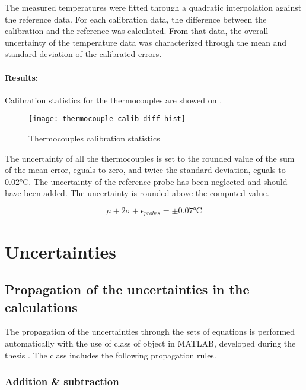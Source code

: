 The measured temperatures were fitted through a quadratic
interpolation against the reference data. For each calibration data,
the difference between the calibration and the reference was
calculated. From that data, the overall uncertainty of the temperature
data was characterized through the mean and standard deviation of the
calibrated errors.

\paragraph{Results:}

Calibration statistics for the thermocouples are showed on
.

\begin{figure}[h!htbp]
  \centering
  \texttt{[image: thermocouple-calib-diff-hist]}
  \caption{Thermocouples calibration statistics}
  \label{fig:bwp-T-calib-stats}
\end{figure}

The uncertainty of all the thermocouples is set to the rounded value
of the sum of the mean error, eguals to zero, and twice the standard
deviation, eguals to 0.02\si{\degreeCelsius}. The uncertainty of the
reference probe has been neglected and should have been added. The
uncertainty is rounded above the computed value.

\begin{equation}
  \label{eq:bwp-T-uncert}
  \mu + 2\sigma + \epsilon_{probes} = \pm 0.07\text{°C}
\end{equation}

\section{Uncertainties}
\label{sec:uncert}

\subsection{Propagation of the uncertainties in the calculations}
\label{sec:uncert-propag}

The propagation of the uncertainties through the sets of equations is
performed automatically with the use of class of object in MATLAB,
developed during the thesis \citep{carre-2015a}. The class includes
the following propagation rules.

\subsubsection{Addition \& subtraction}

